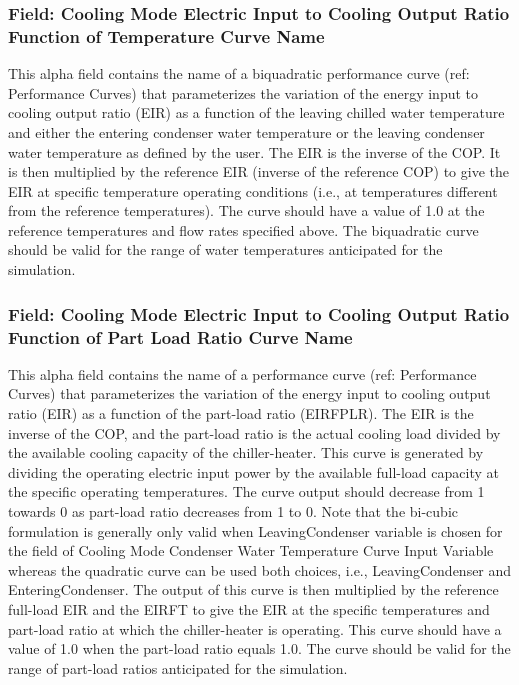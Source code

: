 \subsubsection{Field: Cooling Mode Electric Input to Cooling Output Ratio Function of Temperature Curve Name}\label{field-cooling-mode-electric-input-to-cooling-output-ratio-function-of-temperature-curve-name}

This alpha field contains the name of a biquadratic performance curve (ref: Performance Curves) that parameterizes the variation of the energy input to cooling output ratio (EIR) as a function of the leaving chilled water temperature and either the entering condenser water temperature or the leaving condenser water temperature as defined by the user. The EIR is the inverse of the COP. It is then multiplied by the reference EIR (inverse of the reference COP) to give the EIR at specific temperature operating conditions (i.e., at temperatures different from the reference temperatures). The curve should have a value of 1.0 at the reference temperatures and flow rates specified above. The biquadratic curve should be valid for the range of water temperatures anticipated for the simulation.

\subsubsection{Field: Cooling Mode Electric Input to Cooling Output Ratio Function of Part Load Ratio Curve Name}\label{field-cooling-mode-electric-input-to-cooling-output-ratio-function-of-part-load-ratio-curve-name}

This alpha field contains the name of a performance curve (ref: Performance Curves) that parameterizes the variation of the energy input to cooling output ratio (EIR) as a function of the part-load ratio (EIRFPLR). The EIR is the inverse of the COP, and the part-load ratio is the actual cooling load divided by the available cooling capacity of the chiller-heater. This curve is generated by dividing the operating electric input power by the available full-load capacity at the specific operating temperatures. The curve output should decrease from 1 towards 0 as part-load ratio decreases from 1 to 0. Note that the bi-cubic formulation is generally only valid when LeavingCondenser variable is chosen for the field of Cooling Mode Condenser Water Temperature Curve Input Variable whereas the quadratic curve can be used both choices, i.e., LeavingCondenser and EnteringCondenser. The output of this curve is then multiplied by the reference full-load EIR and the EIRFT to give the EIR at the specific temperatures and part-load ratio at which the chiller-heater is operating. This curve should have a value of 1.0 when the part-load ratio equals 1.0. The curve should be valid for the range of part-load ratios anticipated for the simulation.

